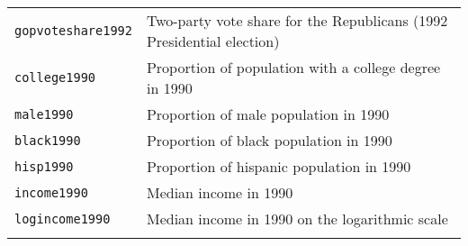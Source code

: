 \documentclass[]{article}
\begin{document}
\begin{longtable}[c]{@{}ll@{}}
\begin{minipage}[t]{0.25\columnwidth}
\texttt{gopvoteshare1992}
\end{minipage} & \begin{minipage}[t]{0.68\columnwidth}\raggedright
Two-party vote share for the Republicans (1992 Presidential election)
\end{minipage}
\\\addlinespace
\begin{minipage}[t]{0.25\columnwidth}\raggedright
\texttt{college1990}
\end{minipage} & \begin{minipage}[t]{0.68\columnwidth}\raggedright
Proportion of population with a college degree in 1990
\end{minipage}
\\\addlinespace
\begin{minipage}[t]{0.25\columnwidth}\raggedright
\texttt{male1990}
\end{minipage} & \begin{minipage}[t]{0.68\columnwidth}\raggedright
Proportion of male population in 1990
\end{minipage}
\\\addlinespace
\begin{minipage}[t]{0.25\columnwidth}\raggedright
\texttt{black1990}
\end{minipage} & \begin{minipage}[t]{0.68\columnwidth}\raggedright
Proportion of black population in 1990
\end{minipage}
\\\addlinespace
\begin{minipage}[t]{0.25\columnwidth}\raggedright
\texttt{hisp1990}
\end{minipage} & \begin{minipage}[t]{0.68\columnwidth}\raggedright
Proportion of hispanic population in 1990
\end{minipage}
\\\addlinespace
\begin{minipage}[t]{0.25\columnwidth}\raggedright
\texttt{income1990}
\end{minipage} & \begin{minipage}[t]{0.68\columnwidth}\raggedright
Median income in 1990
\end{minipage}
\\\addlinespace
\begin{minipage}[t]{0.25\columnwidth}\raggedright
\texttt{logincome1990}
\end{minipage} & \begin{minipage}[t]{0.68\columnwidth}\raggedright
Median income in 1990 on the logarithmic scale
\end{minipage}
\\\addlinespace
\bottomrule
\end{longtable}
\end{document}
